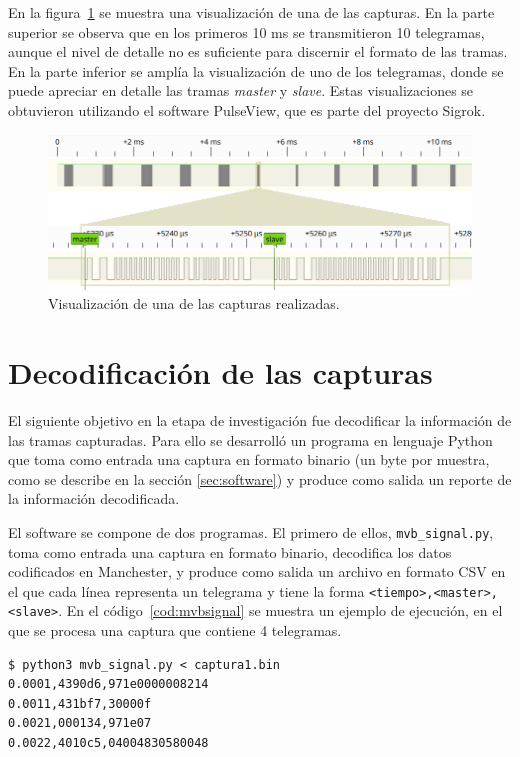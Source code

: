 En la figura~\ref{fig:pulseview} se muestra una visualización de una de las capturas.
En la parte superior se observa que en los primeros 10 ms se transmitieron 10 telegramas, aunque el nivel de detalle no es suficiente para discernir el formato de las tramas.
En la parte inferior se amplía la visualización de uno de los telegramas, donde se puede apreciar en detalle las tramas \textit{master} y \textit{slave}.
Estas visualizaciones se obtuvieron utilizando el software PulseView, que es parte del proyecto Sigrok.

\begin{figure}[htbp!]
	\centering
    \includegraphics[width=\textwidth]{./Figures/pulseview.png}
    \caption{Visualización de una de las capturas realizadas.}
    \label{fig:pulseview}
\end{figure}

\section{Decodificación de las capturas}
\label{sec:decodificacion}

El siguiente objetivo en la etapa de investigación fue decodificar la información de las tramas capturadas. Para ello se desarrolló un programa en lenguaje Python que toma como entrada una captura en formato binario (un byte por muestra, como se describe en la sección \ref{sec:software}) y produce como salida un reporte de la información decodificada.

El software se compone de dos programas. El primero de ellos, \texttt{mvb\_signal.py}, toma como entrada una captura en formato binario, decodifica los datos codificados en Manchester, y produce como salida un archivo en formato CSV en el que cada línea representa un telegrama y tiene la forma \texttt{<tiempo>,\allowbreak <master>,\allowbreak <slave>}. En el código~\ref{cod:mvbsignal} se muestra un ejemplo de ejecución, en el que se procesa una captura que contiene 4 telegramas.

\begin{lstlisting}[label=cod:mvbsignal,caption=Ejemplo de ejecución de \texttt{mvb\_signal.py}.,float=htbp,basicstyle=\footnotesize,breaklines=true]
$ python3 mvb_signal.py < captura1.bin
0.0001,4390d6,971e0000008214
0.0011,431bf7,30000f
0.0021,000134,971e07
0.0022,4010c5,04004830580048
\end{lstlisting}

